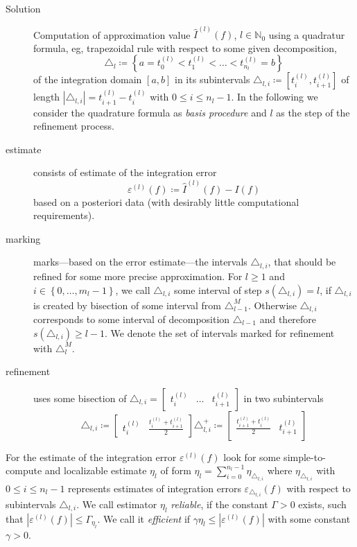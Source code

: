 \documentclass[a4paper]{article}
\numberwithin{lecref}{section}
\theoremstyle{break}
\newcommand{\Abs}[1]{\left|#1\right|}
\newcommand{\Set}[1]{\left\{#1\right\}}
\begin{document}
\begin{description}
  \item[Solution] Computation of approximation value $\hat{I}^{(l)}(f)$, $l \in \mathbb N_0$ using a quadratur formula, eg, trapezoidal rule with respect to some given decomposition,
    \[ \triangle_l \coloneqq \Set{a = t_0^{(l)} < t_1^{(l)} < \dots < t_{n_l}^{(l)} = b} \]
    of the integration domain $[a, b]$ in its subintervals $\triangle_{l, i} \coloneqq [t_i^{(l)}, t_{i+1}^{(l)}]$ of length $\Abs{\triangle_{l, i}} = t_{i+1}^{(l)} - t_i^{(l)}$ with $0 \leq i \leq n_l - 1$. In the following we consider the quadrature formula as \emph{basis procedure} and $l$ as the step of the refinement process.
  \item[estimate] consists of estimate of the integration error
    \[ \varepsilon^{(l)}(f) \coloneqq \hat{I}^{(l)}(f) - I(f) \]
    based on a posteriori data (with desirably little computational requirements).
  \item[marking] marks---based on the error estimate---the intervals $\triangle_{l,i}$, that should be refined for some more precise approximation. For $l \geq 1$ and $i \in \Set{0, \dots, m_l-1}$, we call $\triangle_{l,i}$ some interval of step $s(\triangle_{l,i}) = l$, if $\triangle_{l,i}$ is created by bisection of some interval from $\triangle_{l-1}^M$. Otherwise $\triangle_{l,i}$ corresponds to some interval of decomposition $\triangle_{l-1}$ and therefore $s(\triangle_{l,i}) \geq l-1$. We denote the set of intervals marked for refinement with $\triangle_l^M$.
  \item[refinement] uses some bisection of $\triangle_{l,i} = \begin{bmatrix} t_i^{(l)} & \dots & t_{i+1}^{(l)} \end{bmatrix}$ in two subintervals
    \[
      \triangle_{l,i} \coloneqq \begin{bmatrix} t_i^{(l)} & \frac{t_i^{(l)} + t_{i+1}^{(l)}}{2} \end{bmatrix}
      \triangle_{l,i}^+ \coloneqq \begin{bmatrix} \frac{t_{i+1}^{(l)} + t_{i}^{(l)}}{2} & t_{i+1}^{(l)} \end{bmatrix}
    \]
\end{description}
For the estimate of the integration error $\varepsilon^{(l)}(f)$ look for some simple-to-compute and localizable estimate $\eta_l$ of form $\eta_l = \sum_{i=0}^{n_l-1} \eta_{\triangle_{l,i}}$ where $\eta_{\triangle_{l,i}}$ with $0 \leq i \leq n_l-1$ represents estimates of integration errors $\varepsilon_{\triangle_{l,i}}(f)$ with respect to subintervals $\triangle_{l,i}$. We call estimator $\eta_l$ \emph{reliable}, if the constant $\Gamma > 0$ exists, such that $\Abs{\varepsilon^{(l)}(f)} \leq \Gamma_{\eta_l}$. We call it \emph{efficient} if $\gamma \eta_l \leq \Abs{\varepsilon^{(l)}(f)}$ with some constant $\gamma > 0$.
\end{document}
